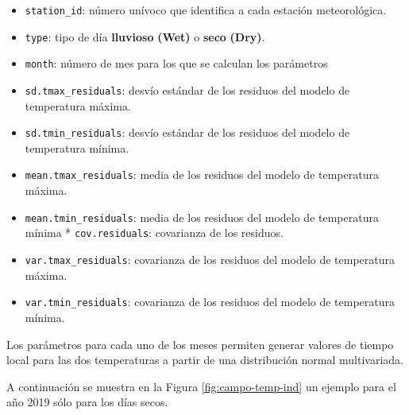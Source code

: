 \documentclass[
  12pt]{article}
\providecommand{\tightlist}{%
  \setlength{\itemsep}{0pt}\setlength{\parskip}{0pt}}
\begin{document}
\begin{itemize}
\tightlist
\item
  \texttt{station\_id}: número unívoco que identifica a cada estación meteorológica.
\item
  \texttt{type}: tipo de día \textbf{lluvioso} \textbf{(Wet)} o \textbf{seco} \textbf{(Dry)}.
\item
  \texttt{month}: número de mes para los que se calculan los parámetros
\item
  \texttt{sd.tmax\_residuals}: desvío estándar de los residuos del modelo de temperatura máxima.
\item
  \texttt{sd.tmin\_residuals}: desvío estándar de los residuos del modelo de temperatura mínima.
\item
  \texttt{mean.tmax\_residuals}: media de los residuos del modelo de temperatura máxima.
\item
  \texttt{mean.tmin\_residuals}: media de los residuos del modelo de temperatura mínima * \texttt{cov.residuals}: covarianza de los residuos.
\item
  \texttt{var.tmax\_residuals}: covarianza de los residuos del modelo de temperatura máxima.
\item
  \texttt{var.tmin\_residuals}: covarianza de los residuos del modelo de temperatura mínima.
\end{itemize}

Los parámetros para cada uno de los meses permiten generar valores de tiempo local para las dos temperaturas a partir de una distribución normal multivariada.

A continuación se muestra en la Figura \ref{fig:campo-temp-ind} un ejemplo para el año 2019 sólo para los días secos.
\end{document}
